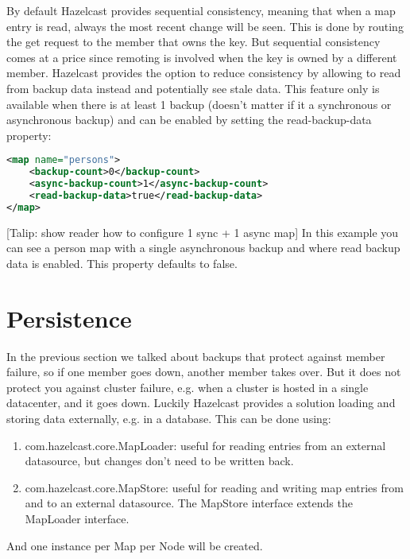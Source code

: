 By default Hazelcast provides sequential consistency, meaning that when a map entry is read, always the most recent change will be seen. This is done by routing the get request to the member that owns the key. But sequential consistency comes at a price since remoting is involved when the key is owned by a different member. Hazelcast provides the option to reduce consistency by allowing to read from backup data instead and potentially see stale data. This feature only is available when there is at least 1 backup (doesn't matter if it a synchronous or asynchronous backup) and can be enabled by setting the read-backup-data property:
\begin{lstlisting}[language=xml]
<map name="persons">
    <backup-count>0</backup-count>
    <async-backup-count>1</async-backup-count>
    <read-backup-data>true</read-backup-data>
</map>
\end{lstlisting}
[Talip: show reader how to configure 1 sync + 1 async map]
In this example you can see a person map with a single asynchronous backup and where read backup data is enabled. This property defaults to false.

\section{Persistence}
In the previous section we talked about backups that protect against member failure, so if one member goes down, another member takes over. But it does not protect you against cluster failure, e.g. when a cluster is hosted in a single datacenter, and it goes down. Luckily Hazelcast provides a solution loading and storing data externally, e.g. in a database. This can be done using:
\begin{enumerate}
\item com.hazelcast.core.MapLoader: useful for reading entries from an external datasource, but changes don't need to be written back.
\item com.hazelcast.core.MapStore: useful for reading and writing map entries from and to an external datasource. The MapStore interface extends the MapLoader interface.
\end{enumerate}
And one instance per Map per Node will be created.

